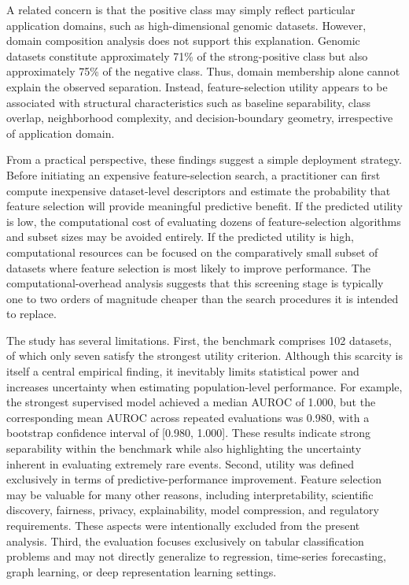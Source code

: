 \documentclass[preprint,12pt,authoryear]{elsarticle}
\begin{document}
A related concern is that the positive class may simply reflect particular application domains, such as high-dimensional genomic datasets. However, domain composition analysis does not support this explanation. Genomic datasets constitute approximately 71\% of the strong-positive class but also approximately 75\% of the negative class. Thus, domain membership alone cannot explain the observed separation. Instead, feature-selection utility appears to be associated with structural characteristics such as baseline separability, class overlap, neighborhood complexity, and decision-boundary geometry, irrespective of application domain.

From a practical perspective, these findings suggest a simple deployment strategy. Before initiating an expensive feature-selection search, a practitioner can first compute inexpensive dataset-level descriptors and estimate the probability that feature selection will provide meaningful predictive benefit. If the predicted utility is low, the computational cost of evaluating dozens of feature-selection algorithms and subset sizes may be avoided entirely. If the predicted utility is high, computational resources can be focused on the comparatively small subset of datasets where feature selection is most likely to improve performance. The computational-overhead analysis suggests that this screening stage is typically one to two orders of magnitude cheaper than the search procedures it is intended to replace.

The study has several limitations. First, the benchmark comprises 102 datasets, of which only seven satisfy the strongest utility criterion. Although this scarcity is itself a central empirical finding, it inevitably limits statistical power and increases uncertainty when estimating population-level performance. For example, the strongest supervised model achieved a median AUROC of 1.000, but the corresponding mean AUROC across repeated evaluations was 0.980, with a bootstrap confidence interval of [0.980, 1.000]. These results indicate strong separability within the benchmark while also highlighting the uncertainty inherent in evaluating extremely rare events. Second, utility was defined exclusively in terms of predictive-performance improvement. Feature selection may be valuable for many other reasons, including interpretability, scientific discovery, fairness, privacy, explainability, model compression, and regulatory requirements. These aspects were intentionally excluded from the present analysis. Third, the evaluation focuses exclusively on tabular classification problems and may not directly generalize to regression, time-series forecasting, graph learning, or deep representation learning settings.
\end{document}
